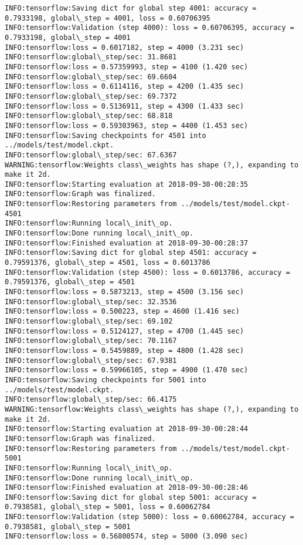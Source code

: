 \documentclass[11pt]{article}
\begin{document}
\begin{Verbatim}[commandchars=\\\{\}]
INFO:tensorflow:Saving dict for global step 4001: accuracy = 0.7933198, global\_step = 4001, loss = 0.60706395
INFO:tensorflow:Validation (step 4000): loss = 0.60706395, accuracy = 0.7933198, global\_step = 4001
INFO:tensorflow:loss = 0.6017182, step = 4000 (3.231 sec)
INFO:tensorflow:global\_step/sec: 31.8681
INFO:tensorflow:loss = 0.57359993, step = 4100 (1.420 sec)
INFO:tensorflow:global\_step/sec: 69.6604
INFO:tensorflow:loss = 0.6114116, step = 4200 (1.435 sec)
INFO:tensorflow:global\_step/sec: 69.7372
INFO:tensorflow:loss = 0.5136911, step = 4300 (1.433 sec)
INFO:tensorflow:global\_step/sec: 68.818
INFO:tensorflow:loss = 0.59303963, step = 4400 (1.453 sec)
INFO:tensorflow:Saving checkpoints for 4501 into ../models/test/model.ckpt.
INFO:tensorflow:global\_step/sec: 67.6367
WARNING:tensorflow:Weights class\_weights has shape (?,), expanding to make it 2d.
INFO:tensorflow:Starting evaluation at 2018-09-30-00:28:35
INFO:tensorflow:Graph was finalized.
INFO:tensorflow:Restoring parameters from ../models/test/model.ckpt-4501
INFO:tensorflow:Running local\_init\_op.
INFO:tensorflow:Done running local\_init\_op.
INFO:tensorflow:Finished evaluation at 2018-09-30-00:28:37
INFO:tensorflow:Saving dict for global step 4501: accuracy = 0.79591376, global\_step = 4501, loss = 0.6013786
INFO:tensorflow:Validation (step 4500): loss = 0.6013786, accuracy = 0.79591376, global\_step = 4501
INFO:tensorflow:loss = 0.5873213, step = 4500 (3.156 sec)
INFO:tensorflow:global\_step/sec: 32.3536
INFO:tensorflow:loss = 0.500223, step = 4600 (1.416 sec)
INFO:tensorflow:global\_step/sec: 69.102
INFO:tensorflow:loss = 0.5124127, step = 4700 (1.445 sec)
INFO:tensorflow:global\_step/sec: 70.1167
INFO:tensorflow:loss = 0.5459889, step = 4800 (1.428 sec)
INFO:tensorflow:global\_step/sec: 67.9381
INFO:tensorflow:loss = 0.59966105, step = 4900 (1.470 sec)
INFO:tensorflow:Saving checkpoints for 5001 into ../models/test/model.ckpt.
INFO:tensorflow:global\_step/sec: 66.4175
WARNING:tensorflow:Weights class\_weights has shape (?,), expanding to make it 2d.
INFO:tensorflow:Starting evaluation at 2018-09-30-00:28:44
INFO:tensorflow:Graph was finalized.
INFO:tensorflow:Restoring parameters from ../models/test/model.ckpt-5001
INFO:tensorflow:Running local\_init\_op.
INFO:tensorflow:Done running local\_init\_op.
INFO:tensorflow:Finished evaluation at 2018-09-30-00:28:46
INFO:tensorflow:Saving dict for global step 5001: accuracy = 0.7938581, global\_step = 5001, loss = 0.60062784
INFO:tensorflow:Validation (step 5000): loss = 0.60062784, accuracy = 0.7938581, global\_step = 5001
INFO:tensorflow:loss = 0.56800574, step = 5000 (3.090 sec)

\end{Verbatim}
\end{document}
